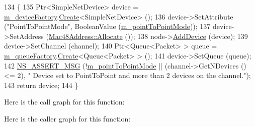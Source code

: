 \begin{DoxyCode}
134 \{
135   Ptr<SimpleNetDevice> device = \hyperlink{classns3_1_1SimpleNetDeviceHelper_a2555ba53ee4e238d63425937d196532f}{m\_deviceFactory}.\hyperlink{classns3_1_1ObjectFactory_a18152e93f0a6fe184ed7300cb31e9896}{Create}<SimpleNetDevice> ();
136   device->SetAttribute (\textcolor{stringliteral}{"PointToPointMode"}, BooleanValue (\hyperlink{classns3_1_1SimpleNetDeviceHelper_ae12061387bb5a253a4f812a34e90d5a5}{m\_pointToPointMode}));
137   device->SetAddress (\hyperlink{classns3_1_1Mac48Address_a203b53c035649c0d4881fa1115aa2cdb}{Mac48Address::Allocate} ());
138   node->\hyperlink{classns3_1_1Node_a42ff83ee1d5d1649c770d3f5b62375de}{AddDevice} (device);
139   device->SetChannel (channel);
140   Ptr<Queue<Packet> > queue = \hyperlink{classns3_1_1SimpleNetDeviceHelper_a418875bf03c8a15b617f4cdcb57f69ef}{m\_queueFactory}.\hyperlink{classns3_1_1ObjectFactory_a18152e93f0a6fe184ed7300cb31e9896}{Create}<Queue<Packet> > ();
141   device->SetQueue (queue);
142   \hyperlink{assert_8h_aff5ece9066c74e681e74999856f08539}{NS\_ASSERT\_MSG} (!\hyperlink{classns3_1_1SimpleNetDeviceHelper_ae12061387bb5a253a4f812a34e90d5a5}{m\_pointToPointMode} || (channel->GetNDevices () <= 2), \textcolor{stringliteral}{"
      Device set to PointToPoint and more than 2 devices on the channel."});
143   \textcolor{keywordflow}{return} device;
144 \}
\end{DoxyCode}


Here is the call graph for this function\+:




Here is the caller graph for this function\+:



